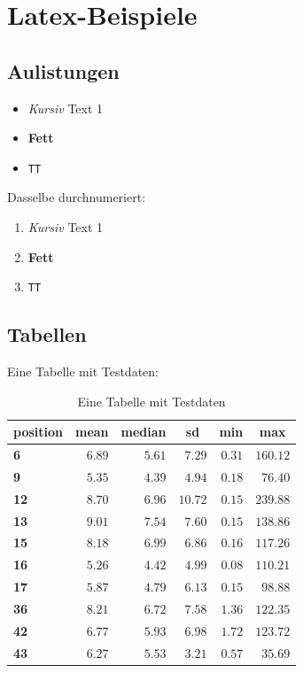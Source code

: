
\chapter{Latex-Beispiele}
\label{chap:bsp}

\section{Aulistungen}

\begin{itemize}
	\item \textit{Kursiv} Text 1
	\item \textbf{Fett}  
	\item \texttt{TT} 
\end{itemize}

Dasselbe durchnumeriert:

\begin{enumerate}
	\item \textit{Kursiv} Text 1
	\item \textbf{Fett}  
	\item \texttt{TT} 
\end{enumerate}

\newpage
\section{Tabellen}

Eine Tabelle mit Testdaten:


\begin{table}[H]
	\begin{center}
		\begin{tabular}{lrrrrr}\hline\hline
			\multicolumn{1}{l}{\textbf{position}}&
			\multicolumn{1}{c}{\textbf{mean}}&
			\multicolumn{1}{c}{\textbf{median}}&
			\multicolumn{1}{c}{\textbf{sd}}&
			\multicolumn{1}{c}{\textbf{min}}&
			\multicolumn{1}{c}{\textbf{max}}
			\\ \hline
			\textbf{6}&$6.89$&$5.61$&$ 7.29$&$0.31$&$160.12$\\
			\textbf{9}&$5.35$&$4.39$&$ 4.94$&$0.18$&$ 76.40$\\
			\textbf{12}&$8.70$&$6.96$&$10.72$&$0.15$&$239.88$\\
			\textbf{13}&$9.01$&$7.54$&$ 7.60$&$0.15$&$138.86$\\
			\textbf{15}&$8.18$&$6.99$&$ 6.86$&$0.16$&$117.26$\\
			\textbf{16}&$5.26$&$4.42$&$ 4.99$&$0.08$&$110.21$\\
			\textbf{17}&$5.87$&$4.79$&$ 6.13$&$0.15$&$ 98.88$\\
			\textbf{36}&$8.21$&$6.72$&$ 7.58$&$1.36$&$122.35$\\
			\textbf{42}&$6.77$&$5.93$&$ 6.98$&$1.72$&$123.72$\\
			\textbf{43}&$6.27$&$5.53$&$ 3.21$&$0.57$&$ 35.69$\\
			\hline
		\end{tabular}
	\end{center}
	\caption{Eine Tabelle mit Testdaten} 
	\label{tabelle:test}
\end{table}

